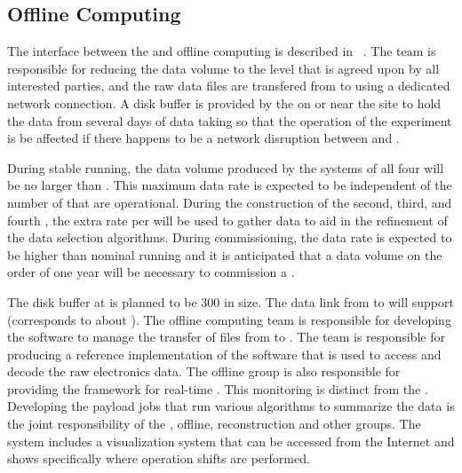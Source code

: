 \subsection{Offline Computing} %
\label{sec:fd-daq-intfc-fnal-cmptg}

The interface between the  and offline computing is
described in ~\cite{docdb-7123}.
The  team is responsible for reducing the data volume
to the level that is agreed upon by all interested parties, and the
raw data files are transfered from \surf to \fnal using a
dedicated network connection.
A disk buffer is provided by the  on or near the \surf
site to hold the data from several days of data taking so that the
operation of the experiment is be affected if there happens to
be a network disruption between \surf and \fnal.

During stable running, the data volume produced by the
 systems of all four  will be no larger
than \offsitepbpy.
This maximum data rate is expected to be independent of the number of
 that are operational.
During the construction of the second, third, and fourth
, the extra rate per  will be used
to gather data to aid in the refinement of the data selection
algorithms.
During commissioning, the data rate is expected to be higher than
nominal running and it is anticipated that  %
a data volume on the order of one year will be necessary to commission a .

The disk buffer at \surf is planned to be \SI{300}{\TB} in size.
The data link from \surf to \fnal will support \surffnalbw
(\offsitepbpy corresponds to about \offsitegbps).
The offline computing team is responsible for developing the
software to manage the transfer of files from \surf to \fnal.
The  team is responsible for producing a reference
implementation of the software that is used to access and decode the
raw electronics data.
The offline group is also responsible for providing the framework
for real-time . 
This monitoring is distinct from the .
Developing the payload jobs that run various algorithms to
summarize the data is the joint responsibility of the , offline,
reconstruction and other groups.
The  system includes a visualization system that can be
accessed from the Internet and shows specifically where operation shifts are
performed.

